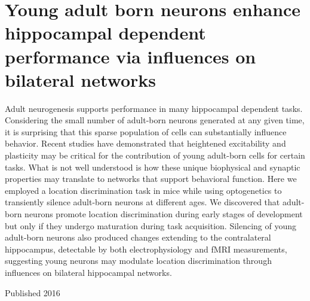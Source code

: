 \section*{Young adult born neurons enhance hippocampal dependent performance via influences on bilateral networks}
\label{sec:jm}

Adult neurogenesis supports performance in many hippocampal dependent tasks.
Considering the small number of adult-born neurons generated at any given time, it is surprising that this sparse population of cells can substantially influence behavior.
Recent studies have demonstrated that heightened excitability and plasticity may be critical for the contribution of young adult-born cells for certain tasks.
What is not well understood is how these unique biophysical and synaptic properties may translate to networks that support behavioral function.
Here we employed a location discrimination task in mice while using optogenetics to transiently silence adult-born neurons at different ages.
We discovered that adult-born neurons promote location discrimination during early stages of development but only if they undergo maturation during task acquisition.
Silencing of young adult-born neurons also produced changes extending to the contralateral hippocampus, detectable by both electrophysiology and fMRI measurements, suggesting young neurons may modulate location discrimination through influences on bilateral hippocampal networks.

\noindent
Published 2016 \cite{Zhuo_2016}
\clearpage

